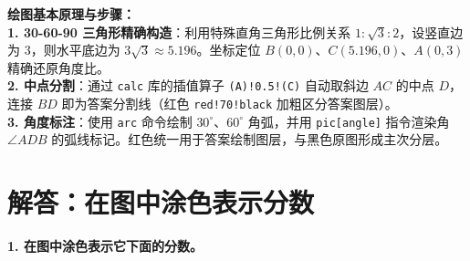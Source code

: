 \vspace{0.6cm}

{\small\color{blue!70!black}
\textbf{绘图基本原理与步骤：}\\
\textbf{1. 30-60-90 三角形精确构造}：利用特殊直角三角形比例关系 $1:\sqrt{3}:2$，设竖直边为 3，则水平底边为 $3\sqrt{3} \approx 5.196$。坐标定位 $B(0,0)$、$C(5.196,0)、A(0,3)$ 精确还原角度比。\\
\textbf{2. 中点分割}：通过 \texttt{calc} 库的插值算子 \texttt{(A)!0.5!(C)} 自动取斜边 $AC$ 的中点 $D$，连接 $BD$ 即为答案分割线（红色 \texttt{red!70!black} 加粗区分答案图层）。\\
\textbf{3. 角度标注}：使用 \texttt{arc} 命令绘制 $30^\circ$、$60^\circ$ 角弧，并用 \texttt{pic[angle]} 指令渲染角 $\angle ADB$ 的弧线标记。红色统一用于答案绘制图层，与黑色原图形成主次分层。
}



\section{解答：在图中涂色表示分数}

\vspace{0.4cm}

\noindent\textbf{1. 在图中涂色表示它下面的分数。}

\vspace{0.8cm}

